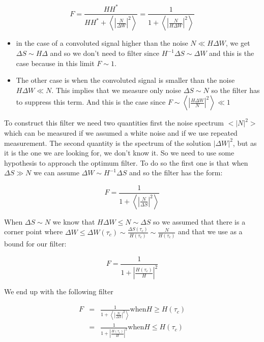 \documentclass[english]{article}
\begin{document}
\begin{equation}
F = \frac{HH^{\ast}}{HH^{\ast}+\left<\left|\frac{N}{\Delta W}\right|^{2}\right>} = \frac{1}{1+\left<\left|\frac{N}{H\Delta W}\right|^{2}\right>}
\end{equation}

\begin{itemize}
\item in the case of a convoluted signal higher than the noise $N\ll H\Delta W$, we get $\Delta S \sim H\Delta$ and so we don't need to filter since $H^{-1}\Delta S \sim \Delta W$ and this is the case because in this limit $F \sim 1$.
\item The other case is when the convoluted signal is smaller than the noise $H\Delta W\ll N$. This implies that we measure only noise $\Delta S \sim N$ so the filter has to suppress this term. And this is the case since $F \sim \left<\left|\frac{H\Delta W}{N}\right|^{2}\right> \ll 1$
\end{itemize}

To construct this filter we need two quantities first the noise spectrum $<|N|^{2}>$ which can be measured if we assumed a white noise and if we use repeated measurement. The second quantity is the spectrum of the solution $|\Delta W|^{2}$, but as it is the one we are looking for, we don't know it. So we need to use some hypothesis to approach the optimum filter. To do so the first one is that when $\Delta S \gg N$ we can assume $\Delta W \sim H^{-1}\Delta S$ and so the filter has the form:

\begin{equation}
F = \frac{1}{1+\left<\left|\frac{N}{\Delta S}\right|^{2}\right>}
\end{equation}

When $\Delta S \sim N$ we know that $H\Delta W \leq N \sim \Delta S$ so we assumed that there is a corner point where $\Delta W \leq \Delta W(\tau_{c}) \sim \frac{\Delta S(\tau_{c})}{H(\tau_{c})}  \sim \frac{N}{H(\tau_{c})}$ and that we use as a bound for our filter:

\begin{equation}
F = \frac{1}{1+\left|\frac{H(\tau_{c})}{H}\right|^{2}}
\end{equation}

We end up with the following filter

\begin{eqnarray}
F &=& \frac{1}{1+\left<\left|\frac{N}{\Delta S}\right|^{2}\right>} \mathrm{when} H \geq H(\tau_{c}) \\
  &=& \frac{1}{1+\left|\frac{H(\tau_{c})}{H}\right|^{2}} \mathrm{when} H \leq H(\tau_{c}) \\
\end{eqnarray}
\end{document}
